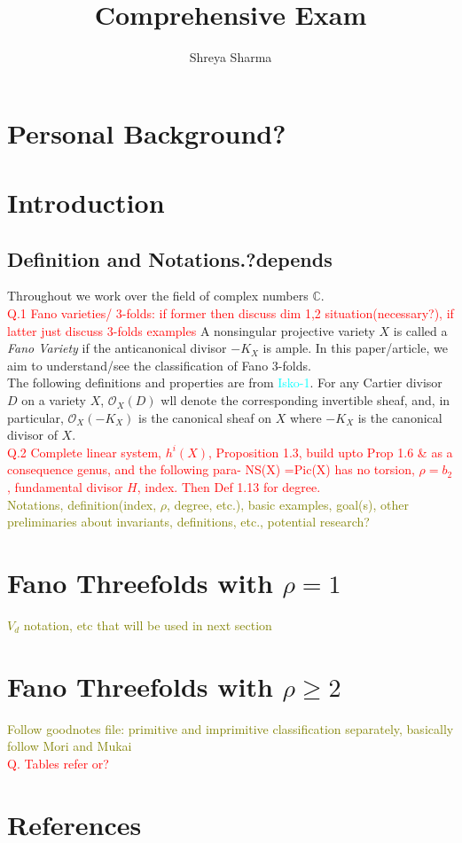 \documentclass[12pt]{amsart}
\begin{document}
	\title{\large{Comprehensive Exam}}
	\date{}
	\author{\small{Shreya Sharma}}
	\maketitle
	\tableofcontents
	
\section{Personal Background?}
\section{Introduction}
\subsection{Definition and Notations.?depends} Throughout we work over the field of complex numbers $\mathbb{C}$. \\
\textcolor{red}{Q.1 Fano varieties/ 3-folds: if former then discuss dim 1,2 situation(necessary?), if latter just discuss 3-folds examples}
A nonsingular projective variety $X$ is called a \textit{Fano Variety} if the anticanonical divisor $-K_X$ is ample. In this paper/article, we aim to understand/see the classification of Fano 3-folds. \\

	The following definitions and properties are from \textcolor{cyan}{Isko-1}. For any Cartier divisor $D$ on a variety $X$, $\mathcal{O}_X(D)$ wll denote the corresponding invertible sheaf, and, in particular, $\mathcal{O}_X(-K_X)$ is the canonical sheaf on $X$ where $-K_X$ is the canonical divisor of $X$. \\
	\textcolor{red}{ Q.2 Complete linear system, $h^i(X)$, Proposition 1.3, build upto Prop 1.6 \& as a consequence genus, and the following para- NS(X) =Pic(X) has no torsion, $\rho=b_2$, fundamental divisor $H$, index. Then Def 1.13 for degree.}\\
	  
	\textcolor{olive}{Notations, definition(index, $\rho$, degree, etc.), basic examples, goal(s), other preliminaries about invariants, definitions, etc., potential research?}
	\section{Fano Threefolds with $\rho =1$}
	\textcolor{olive}{ $V_d$ notation, etc that will be used in next section}
	\section{Fano Threefolds with $\rho \geq 2$}
	\textcolor{olive}{Follow goodnotes file: primitive and imprimitive classification separately, basically follow Mori and Mukai}\\ 
	\textcolor{red}{Q. Tables refer or?}
	\section{References}
\end{document}
